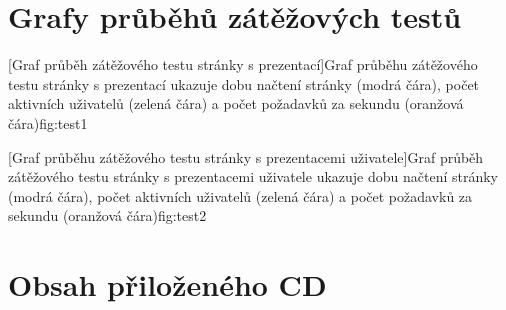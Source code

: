 \documentclass[11pt,twoside,a4paper]{book}
\begin{document}
\chapter{Grafy průběhů zátěžových testů}\label{chap:loadtest}

%
[Graf průběh zátěžového testu stránky s prezentací]{Graf průběhu zátěžového testu stránky s prezentací ukazuje dobu načtení stránky (modrá čára), počet aktivních uživatelů (zelená čára) a počet požadavků za sekundu (oranžová čára)}{fig:test1}

%
[Graf průběhu zátěžového testu stránky s prezentacemi uživatele]{Graf průběh zátěžového testu stránky s prezentacemi uživatele ukazuje dobu načtení stránky (modrá čára), počet aktivních uživatelů (zelená čára) a počet požadavků za sekundu (oranžová čára)}{fig:test2}
	

\chapter{Obsah přiloženého CD}

\end{document}
